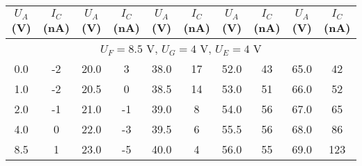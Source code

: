 \begin{table*}
\begin{ruledtabular}
    \begin{tabular}{|cccccccccc|}
        \multicolumn{1}{|c|}{$U_A$ (V)} & \multicolumn{1}{c|}{$I_C$ (nA)} & \multicolumn{1}{c|}{$U_A$ (V)} & \multicolumn{1}{c|}{$I_C$ (nA)} & \multicolumn{1}{c|}{$U_A$ (V)} & \multicolumn{1}{c|}{$I_C$ (nA)} & \multicolumn{1}{c|}{$U_A$ (V)} & \multicolumn{1}{c|}{$I_C$ (nA)} & \multicolumn{1}{c|}{$U_A$ (V)} & $I_C$ (nA) \\ \hline
        \multicolumn{10}{|c|}{$U_F = 8.5$ V,   $U_{G} = 4$ V, $U_E=4$ V}                                                                                                                                                                                                                                                         \\ \hline
        \multicolumn{1}{|c|}{0.0}       & \multicolumn{1}{c|}{-2}         & \multicolumn{1}{c|}{20.0}      & \multicolumn{1}{c|}{3}          & \multicolumn{1}{c|}{38.0}      & \multicolumn{1}{c|}{17}         & \multicolumn{1}{c|}{52.0}      & \multicolumn{1}{c|}{43}         & \multicolumn{1}{c|}{65.0}      & 42         \\ \hline
        \multicolumn{1}{|c|}{1.0}       & \multicolumn{1}{c|}{-2}         & \multicolumn{1}{c|}{20.5}      & \multicolumn{1}{c|}{0}          & \multicolumn{1}{c|}{38.5}      & \multicolumn{1}{c|}{14}         & \multicolumn{1}{c|}{53.0}      & \multicolumn{1}{c|}{51}         & \multicolumn{1}{c|}{66.0}      & 52         \\ \hline
        \multicolumn{1}{|c|}{2.0}       & \multicolumn{1}{c|}{-1}         & \multicolumn{1}{c|}{21.0}      & \multicolumn{1}{c|}{-1}         & \multicolumn{1}{c|}{39.0}      & \multicolumn{1}{c|}{8}          & \multicolumn{1}{c|}{54.0}      & \multicolumn{1}{c|}{56}         & \multicolumn{1}{c|}{67.0}      & 65         \\ \hline
        \multicolumn{1}{|c|}{4.0}       & \multicolumn{1}{c|}{0}          & \multicolumn{1}{c|}{22.0}      & \multicolumn{1}{c|}{-3}         & \multicolumn{1}{c|}{39.5}      & \multicolumn{1}{c|}{6}          & \multicolumn{1}{c|}{55.5}      & \multicolumn{1}{c|}{56}         & \multicolumn{1}{c|}{68.0}      & 86         \\ \hline
        \multicolumn{1}{|c|}{8.5}       & \multicolumn{1}{c|}{1}          & \multicolumn{1}{c|}{23.0}      & \multicolumn{1}{c|}{-5}         & \multicolumn{1}{c|}{40.0}      & \multicolumn{1}{c|}{4}          & \multicolumn{1}{c|}{56.0}      & \multicolumn{1}{c|}{55}         & \multicolumn{1}{c|}{69.0}      & 123        \\ \hline

\end{tabular}
\end{ruledtabular}
\end{table*}
